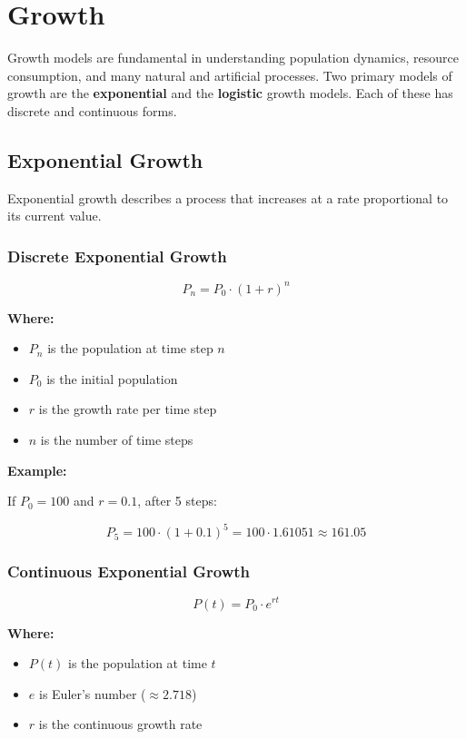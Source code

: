 \newpage
\section{Growth}

Growth models are fundamental in understanding population dynamics, resource consumption, and many natural and artificial processes. Two primary models of growth are the \textbf{exponential} and the \textbf{logistic} growth models. Each of these has discrete and continuous forms.

\subsection{Exponential Growth}

Exponential growth describes a process that increases at a rate proportional to its current value.

\subsubsection{Discrete Exponential Growth}

\[
P_{n} = P_0 \cdot (1 + r)^n
\]

\textbf{Where:}
\begin{itemize}[label=\(-\)]
  \item \(P_n\) is the population at time step \(n\)
  \item \(P_0\) is the initial population
  \item \(r\) is the growth rate per time step
  \item \(n\) is the number of time steps
\end{itemize}

\textbf{Example:}
\vspace{\baselineskip}
  
If \(P_0 = 100\) and \(r = 0.1\), after 5 steps:

\[
P_5 = 100 \cdot {(1 + 0.1)}^5 = 100 \cdot 1.61051 \approx 161.05
\]

\subsubsection{Continuous Exponential Growth}

\[
P(t) = P_0 \cdot e^{rt}
\]

\textbf{Where:}
\begin{itemize}[label=\(-\)]
  \item \(P(t)\) is the population at time \(t\)
  \item \(e\) is Euler’s number (\(\approx 2.718\))
  \item \(r\) is the continuous growth rate
\end{itemize}

